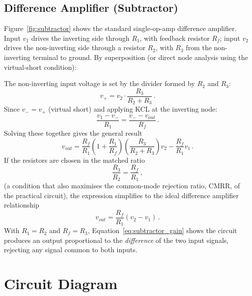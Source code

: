 \subsection{Difference Amplifier (Subtractor)}

Figure~\ref{fig:subtractor} shows the standard single-op-amp difference amplifier. Input $v_1$ drives the inverting side through $R_1$, with feedback resistor $R_f$; input $v_2$ drives the non-inverting side through a resistor $R_2$, with $R_3$ from the non-inverting terminal to ground. By superposition (or direct node analysis using the virtual-short condition):

The non-inverting input voltage is set by the divider formed by $R_2$ and $R_3$:
\begin{equation}
	v_+ = v_2\cdot\frac{R_3}{R_2+R_3}\,.
\end{equation}
Since $v_- = v_+$ (virtual short) and applying KCL at the inverting node:
\begin{equation}
	\frac{v_1 - v_-}{R_1} = \frac{v_- - v_{out}}{R_f}\,.
\end{equation}
Solving these together gives the general result
\begin{equation}
	v_{out} = \frac{R_f}{R_1}\left(1+\frac{R_1}{R_f}\right)\!\left(\frac{R_3}{R_2+R_3}\right)v_2 - \frac{R_f}{R_1}v_1\,.
\end{equation}
If the resistors are chosen in the matched ratio
\begin{equation}
	\frac{R_3}{R_2} = \frac{R_f}{R_1}\,,
	\label{eq:cmrr_condition}
\end{equation}
(a condition that also maximises the common-mode rejection ratio, CMRR, of the practical circuit), the expression simplifies to the ideal difference amplifier relationship
\begin{equation}
	v_{out} = \frac{R_f}{R_1}\left(v_2 - v_1\right)\,.
	\label{eq:subtractor_gain}
\end{equation}
With $R_1 = R_2$ and $R_f = R_3$, Equation~\eqref{eq:subtractor_gain} shows the circuit produces an output proportional to the \emph{difference} of the two input signals, rejecting any signal common to both inputs.

\section{Circuit Diagram}


